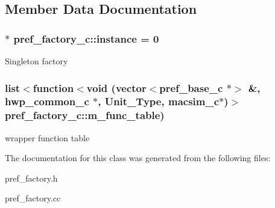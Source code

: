 \subsection{Member Data Documentation}
\hypertarget{classpref__factory__c_a8d68a36f77d53450d4dabb477f99faf5}{
\subsubsection[{instance}]{ $\ast$ {\bf pref\_\-factory\_\-c::instance} = 0}}
\label{classpref__factory__c_a8d68a36f77d53450d4dabb477f99faf5}
Singleton factory \hypertarget{classpref__factory__c_a6a70d54b0cf3cd76600a3060d05dfb49}{
\subsubsection[{m\_\-func\_\-table}]{\setlength{\rightskip}{0pt plus 5cm}list$<$function$<$void (vector$<${\bf pref\_\-base\_\-c} $\ast$$>$ \&, {\bf hwp\_\-common\_\-c} $\ast$, Unit\_\-Type, {\bf macsim\_\-c}$\ast$)$>$  {\bf pref\_\-factory\_\-c::m\_\-func\_\-table})}}
\label{classpref__factory__c_a6a70d54b0cf3cd76600a3060d05dfb49}
wrapper function table 

The documentation for this class was generated from the following files:\begin{DoxyCompactItemize}
\item 
pref\_\-factory.h\item 
pref\_\-factory.cc\end{DoxyCompactItemize}
